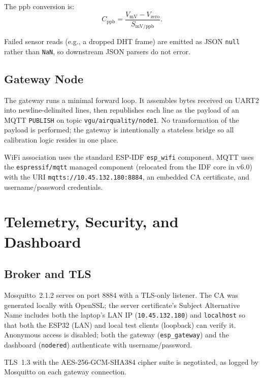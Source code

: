 \documentclass[conference]{IEEEtran}
\begin{document}
The ppb conversion is:
\begin{equation}
C_{\text{ppb}} = \frac{V_{\text{mV}} - V_{\text{zero}}}{S_{\text{mV/ppb}}}.
\label{eq:calib}
\end{equation}

Failed sensor reads (e.g., a dropped DHT frame) are emitted as JSON \texttt{null} rather than \texttt{NaN}, so downstream JSON parsers do not error.

\subsection{Gateway Node}
The gateway runs a minimal forward loop. It assembles bytes received on UART2 into newline-delimited lines, then republishes each line as the payload of an MQTT \texttt{PUBLISH} on topic \texttt{vgu/airquality/node1}. No transformation of the payload is performed; the gateway is intentionally a stateless bridge so all calibration logic resides in one place.

WiFi association uses the standard ESP-IDF \texttt{esp\_wifi} component. MQTT uses the \texttt{espressif/mqtt} managed component (relocated from the IDF core in v6.0) with the URI \texttt{mqtts://10.45.132.180:8884}, an embedded CA certificate, and username/password credentials.

\section{Telemetry, Security, and Dashboard}

\subsection{Broker and TLS}
Mosquitto~2.1.2 serves on port 8884 with a TLS-only listener. The CA was generated locally with OpenSSL; the server certificate's Subject Alternative Name includes both the laptop's LAN IP (\texttt{10.45.132.180}) and \texttt{localhost} so that both the ESP32 (LAN) and local test clients (loopback) can verify it. Anonymous access is disabled; both the gateway (\texttt{esp\_gateway}) and the dashboard (\texttt{nodered}) authenticate with username/password.

TLS~1.3 with the AES-256-GCM-SHA384 cipher suite is negotiated, as logged by Mosquitto on each gateway connection.
\end{document}
